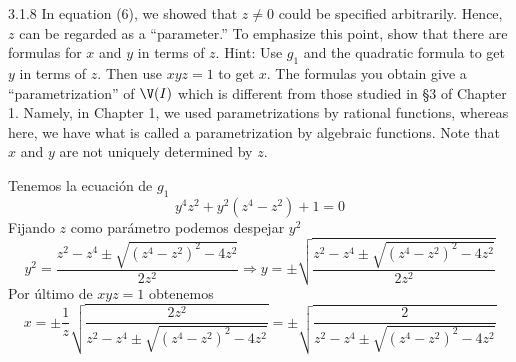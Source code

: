 \documentclass[twoside]{article}
\begin{document}
\newpage

\begin{ejercicio}{3.1.8}
In equation (6), we showed that $z \neq 0$ could be specified arbitrarily. Hence, $z$ can be
regarded as a “parameter.” To emphasize this point, show that there are formulas for $x$ and
$y$ in terms of $z$. Hint: Use $g_1$ and the quadratic formula to get $y$ in terms of $z$. Then use $xyz =
1$ to get $x$. The formulas you obtain give a “parametrization” of $\V(I)$ which is different
from those studied in §3 of Chapter 1. Namely, in Chapter 1, we used parametrizations by rational functions, whereas here, we have what is called a parametrization by algebraic
functions. Note that $x$ and $y$ are not uniquely determined by $z$.
\end{ejercicio}
\begin{solucion}
Tenemos la ecuación de $g_1$
\[
y^4z^2 + y^2(z^4 − z^2) + 1=0
\]
Fijando $z$ como parámetro podemos despejar $y^2$
\[
y^2=\frac{z^2-z^4\pm\sqrt{(z^4-z^2)^2-4z^2}}{2z^2}\Rightarrow y=\pm\sqrt{\frac{z^2-z^4\pm\sqrt{(z^4-z^2)^2-4z^2}}{2z^2}}
\]
Por último de $xyz=1$ obtenemos
\[
x=\pm \frac{1}{z}\sqrt{\frac{2z^2}{z^2-z^4\pm\sqrt{(z^4-z^2)^2-4z^2}}}=\pm \sqrt{\frac{2}{z^2-z^4\pm\sqrt{(z^4-z^2)^2-4z^2}}}
\]
\end{solucion}


\newpage
\end{document}
